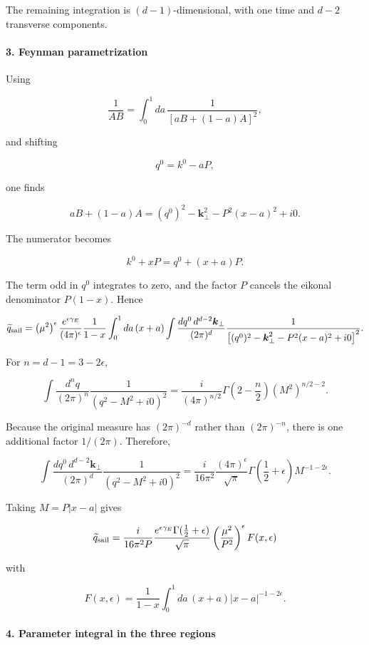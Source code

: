 The remaining integration is $(d-1)$-dimensional, with one time and $d-2$ transverse components.

\paragraph*{3. Feynman parametrization}

Using

\[
\frac1{AB}=\int_0^1 da\,\frac1{[aB+(1-a)A]^2},
\]

and shifting

\[
q^0=k^0-aP,
\]

one finds

\[
aB+(1-a)A = (q^0)^2-\boldsymbol{k}_\perp^2-P^2(x-a)^2+i0.
\]

The numerator becomes

\[
k^0+xP=q^0+(x+a)P.
\]

The term odd in $q^0$ integrates to zero, and the factor $P$ cancels the eikonal denominator $P(1-x)$. Hence

\[
\widetilde q_{\rm sail} = \left(\mu^2\right)^\epsilon \frac{e^{\epsilon\gamma_E}}{(4\pi)^\epsilon} \frac1{1-x} \int_0^1da\,(x+a) \int\frac{dq^0\,d^{d-2}\boldsymbol{k}_\perp}{(2\pi)^d} \frac1{\left[(q^0)^2-\boldsymbol{k}_\perp^2-P^2(x-a)^2+i0\right]^2}.
\]

For $n=d-1=3-2\epsilon$,

\[
\int\frac{d^nq}{(2\pi)^n} \frac1{(q^2-M^2+i0)^2} = \frac{i}{(4\pi)^{n/2}} \Gamma\left(2-\frac n2\right) (M^2)^{n/2-2}.
\]

Because the original measure has $(2\pi)^{-d}$ rather than $(2\pi)^{-n}$, there is one additional factor $1/(2\pi)$. Therefore,

\[
\int\frac{dq^0\,d^{d-2}\boldsymbol{k}_\perp}{(2\pi)^d} \frac1{(q^2-M^2+i0)^2} = \frac{i}{16\pi^2} \frac{(4\pi)^\epsilon}{\sqrt{\pi}} \Gamma\left(\frac12+\epsilon\right) M^{-1-2\epsilon}.
\]

Taking $M=P|x-a|$ gives

\[
{ \widetilde q_{\rm sail} = \frac{i}{16\pi^2P} \frac{e^{\epsilon\gamma_E}\Gamma(\frac12+\epsilon)}{\sqrt{\pi}} \left(\frac{\mu^2}{P^2}\right)^\epsilon F(x,\epsilon) }
\]

with

\[
F(x,\epsilon) = \frac1{1-x}\int_0^1da\, (x+a)|x-a|^{-1-2\epsilon}.
\]

\paragraph*{4. Parameter integral in the three regions}

